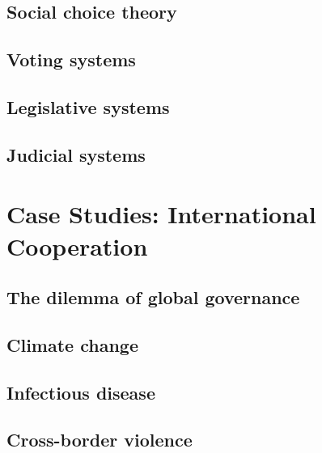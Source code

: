 \documentclass{tufte-book} %
\begin{document}
\section{Social choice theory}

\section{Voting systems}

\section{Legislative systems}

\section{Judicial systems}


\chapter{Case Studies: International Cooperation}\label{intl-coop}

\section{The dilemma of global governance}

\section{Climate change}

\section{Infectious disease}

\section{Cross-border violence}


\backmatter




\printindex %
\end{document}
